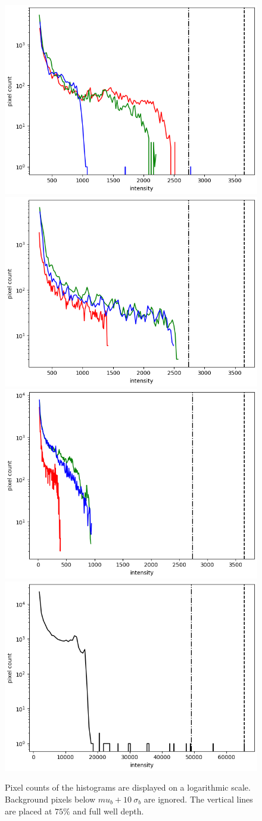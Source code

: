 \documentclass[10pt,a4paper,notitlepage]{article}
\begin{document}
	\begin{figure}[h]
		\includegraphics[width=0.49\columnwidth]{img/alpori_hist.png}
		\includegraphics[width=0.49\columnwidth]{img/betori_hist.png} \\
		\includegraphics[width=0.49\columnwidth]{img/alpcma_hist.png}
		\includegraphics[width=0.49\columnwidth]{img/alpleo_hist.png}
		
		\caption[histograms]%
		{Pixel counts of the histograms are displayed on a logarithmic scale. Background pixels below $mu_b + 10\ \sigma_b$ are ignored. The vertical lines are placed at $75\%$ and full well depth.}
		\label{fig:histograms}
	\end{figure}
	
\end{document}
